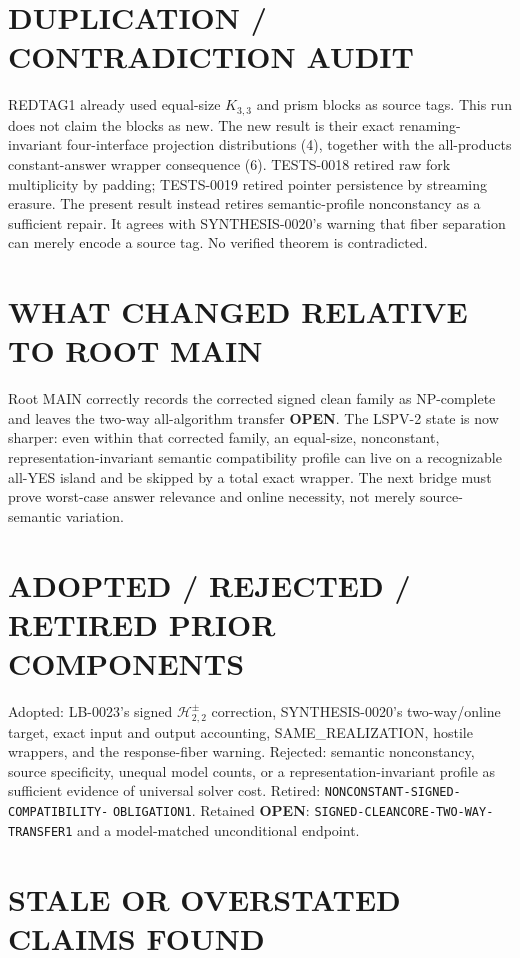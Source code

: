 \documentclass[11pt]{article}
\newcommand{\OPEN}{\textbf{OPEN}}
\begin{document}
\section{DUPLICATION / CONTRADICTION AUDIT}

REDTAG1 already used equal-size $K_{3,3}$ and prism blocks as source tags.
This run does not claim the blocks as new.  The new result is their exact
renaming-invariant four-interface projection distributions (4), together with
the all-products constant-answer wrapper consequence (6).  TESTS-0018 retired
raw fork multiplicity by padding; TESTS-0019 retired pointer persistence by
streaming erasure.  The present result instead retires semantic-profile
nonconstancy as a sufficient repair.  It agrees with SYNTHESIS-0020's warning
that fiber separation can merely encode a source tag.  No verified theorem is
contradicted.

\section{WHAT CHANGED RELATIVE TO ROOT MAIN}

Root MAIN correctly records the corrected signed clean family as NP-complete
and leaves the two-way all-algorithm transfer \OPEN.  The LSPV-2 state is now
sharper: even within that corrected family, an equal-size, nonconstant,
representation-invariant semantic compatibility profile can live on a
recognizable all-YES island and be skipped by a total exact wrapper.  The next
bridge must prove worst-case answer relevance and online necessity, not merely
source-semantic variation.

\section{ADOPTED / REJECTED / RETIRED PRIOR COMPONENTS}

Adopted: LB-0023's signed $\mathcal H^{\pm}_{2,2}$ correction,
SYNTHESIS-0020's two-way/online target, exact input and output accounting,
SAME\_REALIZATION, hostile wrappers, and the response-fiber warning.  Rejected:
semantic nonconstancy, source specificity, unequal model counts, or a
representation-invariant profile as sufficient evidence of universal solver
cost.  Retired: \texttt{NONCONSTANT-SIGNED-COMPATIBILITY-}\allowbreak
\texttt{OBLIGATION1}.
Retained \OPEN: \texttt{SIGNED-CLEANCORE-TWO-WAY-TRANSFER1} and a
model-matched unconditional endpoint.

\section{STALE OR OVERSTATED CLAIMS FOUND}
\end{document}
